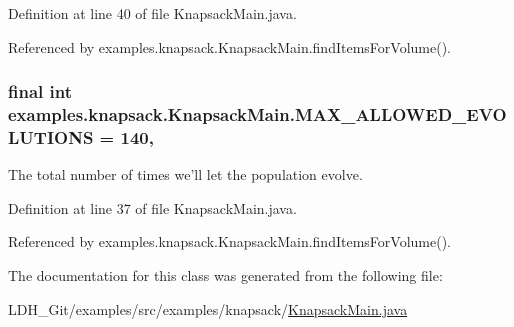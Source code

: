 Definition at line 40 of file Knapsack\-Main.\-java.



Referenced by examples.\-knapsack.\-Knapsack\-Main.\-find\-Items\-For\-Volume().

\hypertarget{classexamples_1_1knapsack_1_1_knapsack_main_a422a541b748d8950d8477962c996b587}{
\subsubsection[{M\-A\-X\-\_\-\-A\-L\-L\-O\-W\-E\-D\-\_\-\-E\-V\-O\-L\-U\-T\-I\-O\-N\-S}]{\setlength{\rightskip}{0pt plus 5cm}final int examples.\-knapsack.\-Knapsack\-Main.\-M\-A\-X\-\_\-\-A\-L\-L\-O\-W\-E\-D\-\_\-\-E\-V\-O\-L\-U\-T\-I\-O\-N\-S = 140\hspace{0.3cm}{\ttfamily [static]}, {\ttfamily [private]}}}\label{classexamples_1_1knapsack_1_1_knapsack_main_a422a541b748d8950d8477962c996b587}
The total number of times we'll let the population evolve. 

Definition at line 37 of file Knapsack\-Main.\-java.



Referenced by examples.\-knapsack.\-Knapsack\-Main.\-find\-Items\-For\-Volume().



The documentation for this class was generated from the following file\-:\begin{DoxyCompactItemize}
\item 
L\-D\-H\-\_\-\-Git/examples/src/examples/knapsack/\hyperlink{knapsack_2_knapsack_main_8java}{Knapsack\-Main.\-java}\end{DoxyCompactItemize}
